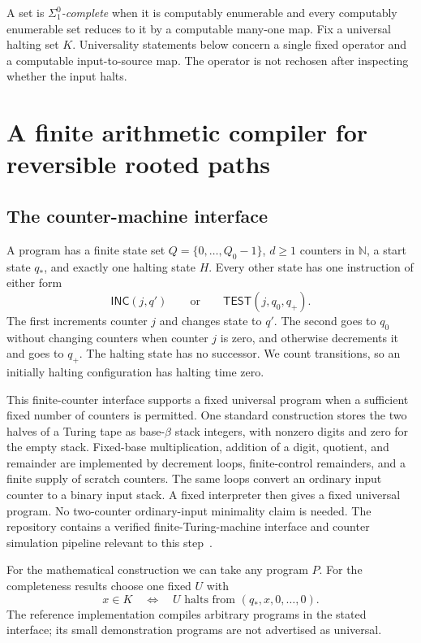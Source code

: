\documentclass[11pt,letterpaper]{article}
\theoremstyle{definition}
\theoremstyle{remark}
\newcommand{\N}{\mathbb N}
\newcommand{\inc}{\mathsf{INC}}
\newcommand{\test}{\mathsf{TEST}}
\begin{document}
A set is \emph{$\Sigma^0_1$-complete} when it is computably enumerable and every
computably enumerable set reduces to it by a computable many-one map. Fix a
universal halting set $K$. Universality statements below concern a single
fixed operator and a computable input-to-source map. The operator is not
rechosen after inspecting whether the input halts.

\section{A finite arithmetic compiler for reversible rooted paths}
\label{ste:wc:sec:history}

\subsection{The counter-machine interface}
A program has a finite state set $Q=\{0,\ldots,Q_0-1\}$, $d\geq1$ counters
in $\N$, a start state $q_*$, and exactly one halting state $H$. Every other
state has one instruction of either form
\[
 \inc(j,q')\qquad\text{or}\qquad\test(j,q_0,q_+).
\]
The first increments counter $j$ and changes state to $q'$. The second goes
to $q_0$ without changing counters when counter $j$ is zero, and otherwise
decrements it and goes to $q_+$. The halting state has no successor. We count
transitions, so an initially halting configuration has halting time zero.

This finite-counter interface supports a fixed universal program when a
sufficient fixed number of counters is permitted. One standard construction
stores the two halves of a Turing tape as base-$\beta$ stack integers, with
nonzero digits and zero for the empty stack. Fixed-base multiplication,
addition of a digit, quotient, and remainder are implemented by decrement
loops, finite-control remainders, and a finite supply of scratch counters.
The same loops convert an ordinary input counter to a binary input stack.
A fixed interpreter then gives a fixed universal program. No two-counter
ordinary-input minimality claim is needed. The repository contains a
verified finite-Turing-machine interface and counter simulation pipeline
relevant to this step~\cite{repoTM}.

For the mathematical construction we can take any program $P$. For the
completeness results choose one fixed $U$ with
\[
 x\in K\quad\Longleftrightarrow\quad
 U\text{ halts from }(q_*,x,0,\ldots,0).
\]
The reference implementation compiles arbitrary programs in the stated
interface; its small demonstration programs are not advertised as universal.
\end{document}
